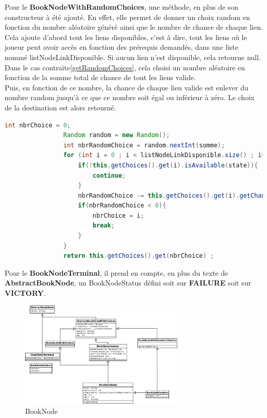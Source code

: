 			Pour le \textbf{BookNodeWithRandomChoices}, une méthode, en plus de son constructeur à été ajouté. En effet, elle permet de donner un choix random en fonction du nombre aléatoire généré ainsi que le nombre de chance de chaque lien. Cela ajoute d'abord tout les liens disponibles, c'est à dire, tout les liens où le joueur peut avoir accès en fonction des prérequis demandés, dans une liste nommé listNodeLinkDisponible. Si aucun lien n'est disponible, cela retourne null. Dans le cas contraite\ref{getRandomChoices}, cela choisi un nombre aléatoire en fonction de la somme total de chance de tout les liens valide.\\
			Puis, en fonction de ce nombre, la chance de chaque lien valide est enlever du nombre random jusqu'à ce que ce nombre soit égal ou inférieur à zéro. Le choix de la destination est alors retourné.\\
			\begin{lstlisting}[language=java, label=getRandomChoices]
				int nbrChoice = 0;
				Random random = new Random();
				int nbrRandomChoice = random.nextInt(somme);
				for (int i = 0 ; i < listNodeLinkDisponible.size() ; i++){
					if(!this.getChoices().get(i).isAvailable(state)){
						continue;
					}
					nbrRandomChoice -= this.getChoices().get(i).getChance();
					if(nbrRandomChoice < 0){
						nbrChoice = i;
						break;
					}
				}
				return this.getChoices().get(nbrChoice) ;
			\end{lstlisting}

			Pour le \textbf{BookNodeTerminal}, il prend en compte, en plus du texte de \textbf{AbstractBookNode}, un BookNodeStatus défini soit sur \textbf{FAILURE} soit sur \textbf{VICTORY}.

			\begin{figure}[H]
				\centering\includegraphics[width=0.70\textwidth]{img/BookNode.png}
				\caption{BookNode}
				\label{fig:BookNode}
			\end{figure}

